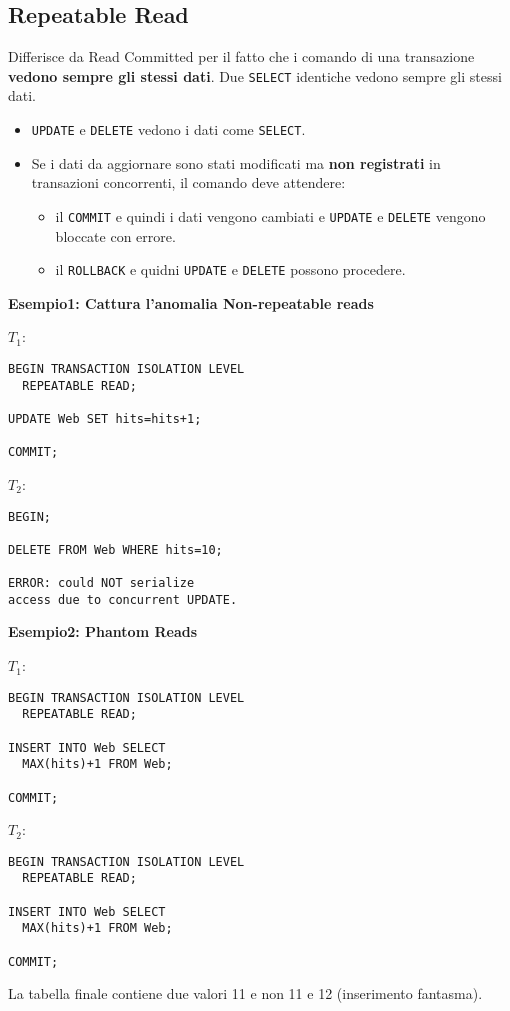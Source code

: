 \documentclass[a4paper, 10pt]{article}
\begin{document}
		\subsection{Repeatable Read}
			Differisce da Read Committed per il fatto che i comando di una transazione \textbf{vedono sempre gli stessi dati}. Due \lstinline|SELECT| identiche vedono sempre gli stessi dati.
			\begin{itemize}
				\item \lstinline|UPDATE| e \lstinline|DELETE| vedono i dati come \lstinline|SELECT|.
				\item Se i dati da aggiornare sono stati modificati ma \textbf{non registrati} in transazioni concorrenti, il comando deve attendere: 
				\begin{itemize}
					\item il \lstinline|COMMIT| e quindi i dati vengono cambiati e \lstinline|UPDATE| e \lstinline|DELETE| vengono bloccate con errore.
					\item il \lstinline|ROLLBACK| e quidni \lstinline|UPDATE| e \lstinline|DELETE| possono procedere.
				\end{itemize}
			\end{itemize}
			
			\newpage
			\noindent
			\textbf{Esempio1: Cattura l'anomalia Non-repeatable reads}
			\begin{multicols}{2}
			\noindent
			$ T_1 $:
			\begin{lstlisting}
BEGIN TRANSACTION ISOLATION LEVEL
  REPEATABLE READ;

UPDATE Web SET hits=hits+1;

COMMIT;
			\end{lstlisting}
			\columnbreak
			$ T_2 $:
			\begin{lstlisting}
BEGIN;

DELETE FROM Web WHERE hits=10;

ERROR: could NOT serialize 
access due to concurrent UPDATE.
			\end{lstlisting}
			\end{multicols}
			\noindent
			\textbf{Esempio2: Phantom Reads}
			\begin{multicols}{2}
			\noindent
			$ T_1 $:
			\begin{lstlisting}
BEGIN TRANSACTION ISOLATION LEVEL
  REPEATABLE READ;
 
INSERT INTO Web SELECT
  MAX(hits)+1 FROM Web;
  
COMMIT;
			\end{lstlisting}
			\columnbreak
			$ T_2 $:
			\begin{lstlisting}
BEGIN TRANSACTION ISOLATION LEVEL
  REPEATABLE READ;

INSERT INTO Web SELECT
  MAX(hits)+1 FROM Web;

COMMIT;
			\end{lstlisting}
			\end{multicols}
		La tabella finale contiene due valori 11 e non 11 e 12 (inserimento fantasma).
		
\end{document}
